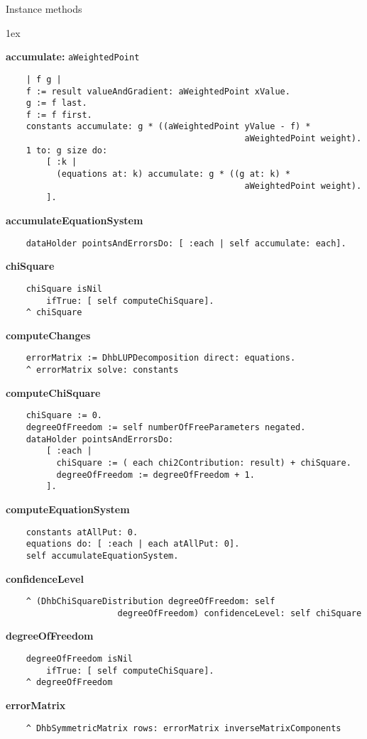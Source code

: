 Instance methods
{\parskip 1ex\par\noindent}
{\bf accumulate:} {\tt aWeightedPoint}
\begin{verbatim}
    | f g |
    f := result valueAndGradient: aWeightedPoint xValue.
    g := f last.
    f := f first.
    constants accumulate: g * ((aWeightedPoint yValue - f) * 
                                               aWeightedPoint weight).
    1 to: g size do:
        [ :k |
          (equations at: k) accumulate: g * ((g at: k) * 
                                               aWeightedPoint weight).
        ].
\end{verbatim}
{\bf accumulateEquationSystem}
\begin{verbatim}
    dataHolder pointsAndErrorsDo: [ :each | self accumulate: each].
\end{verbatim}
{\bf chiSquare}
\begin{verbatim}
    chiSquare isNil
        ifTrue: [ self computeChiSquare].
    ^ chiSquare
\end{verbatim}
{\bf computeChanges}
\begin{verbatim}
    errorMatrix := DhbLUPDecomposition direct: equations.
    ^ errorMatrix solve: constants
\end{verbatim}
{\bf computeChiSquare}
\begin{verbatim}
    chiSquare := 0.
    degreeOfFreedom := self numberOfFreeParameters negated.
    dataHolder pointsAndErrorsDo:
        [ :each |
          chiSquare := ( each chi2Contribution: result) + chiSquare.
          degreeOfFreedom := degreeOfFreedom + 1.
        ].
\end{verbatim}
{\bf computeEquationSystem}
\begin{verbatim}
    constants atAllPut: 0.
    equations do: [ :each | each atAllPut: 0].
    self accumulateEquationSystem.
\end{verbatim}
{\bf confidenceLevel}
\begin{verbatim}
    ^ (DhbChiSquareDistribution degreeOfFreedom: self 
                      degreeOfFreedom) confidenceLevel: self chiSquare
\end{verbatim}
{\bf degreeOfFreedom}
\begin{verbatim}
    degreeOfFreedom isNil
        ifTrue: [ self computeChiSquare].
    ^ degreeOfFreedom
\end{verbatim}
{\bf errorMatrix}
\begin{verbatim}
    ^ DhbSymmetricMatrix rows: errorMatrix inverseMatrixComponents
\end{verbatim}

